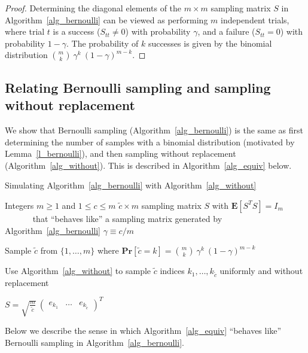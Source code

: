 \documentclass{siamltex}
\begin{document}
\begin{proof}
Determining the diagonal elements of the $m\times m$ sampling matrix
$S$ in Algorithm~\ref{alg_bernoulli}
can be viewed as performing $m$ independent trials, where trial $t$ is
a success ($S_{tt}\neq 0$) with probability $\gamma$,
and a failure ($S_{tt}=0$) with probability $1-\gamma$.
The probability of $k$ successes is given by the binomial distribution 
$\binom{m}{k}\>\gamma^{k}\>(1-\gamma)^{m-k}$.
\end{proof}

\subsection{Relating Bernoulli sampling and sampling without 
replacement}\label{s_relate}
We show  that Bernoulli sampling (Algorithm~\ref{alg_bernoulli})
is the same as first determining the
number of samples with a binomial distribution
(motivated by Lemma~\ref{l_bernoulli}), and then sampling
without replacement (Algorithm~\ref{alg_without}). This is
described in Algorithm~\ref{alg_equiv} below.

\begin{algorithm}
\caption{Simulating Algorithm~\ref{alg_bernoulli} with 
Algorithm~\ref{alg_without}}\label{alg_equiv}
\begin{algorithmic}
\REQUIRE Integers  $m\geq 1$ and $1\leq c\leq m$ 
\ENSURE $\tilde{c}\times m$ sampling matrix $S$ with ${\mathbf{E}}[S^TS]=  I_m$\\
$\qquad\quad$ that ``behaves like'' a sampling matrix
generated by Algorithm~\ref{alg_bernoulli}
\STATE
\STATE $\gamma\equiv c/m$
\smallskip

\STATE Sample $\tilde{c}$ from $\{1,\ldots,m\}$ where
${\mathbf{Pr}}[\tilde{c}=k] = \binom{m}{k}\>\gamma^k\>(1-\gamma)^{m-k}$
\smallskip

\STATE Use Algorithm~\ref{alg_without} to sample $\tilde{c}$ 
indices $k_1,\ldots,k_{\tilde{c}}$ uniformly and without 
replacement
\smallskip

\STATE $S=\sqrt{\tfrac{m}{\tilde{c}}}\>
\begin{pmatrix}e_{k_1} & \ldots & e_{k_{\tilde{c}}}\end{pmatrix}^T$
\end{algorithmic}
\end{algorithm}

Below we describe the sense in which Algorithm~\ref{alg_equiv}
``behaves like'' Bernoulli sampling in Algorithm~\ref{alg_bernoulli}.
\end{document}
